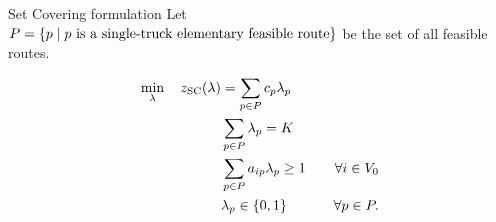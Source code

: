\begin{frame}{Set Covering formulation}
	Let $P = \Set*{p \mid p\ \text{is a single-truck elementary feasible route}}$ be the set of all feasible routes.

	\begin{align}
		\min_{\lambda} \quad z_\mt{SC}(\lambda) & = \sum_{p \in P}  c_p \lambda_p              & \label{eq:set-covering-obj-func}                                                       \\
		                                        & \sum_{p \in P} \lambda_{p} = K               & \label{eq:set-covering-K-routes}                                                       \\
		                                        & \sum_{p \in P}  a_{ip} \lambda_p \ge 1       & \quad \forall i \in V_0 \label{eq:set-covering-customers-visited-by-exactly-one-route} \\
		                                        & \lambda_p                    \in \Set*{0, 1} & \quad \forall p \in P \label{eq:set-covering-lambda-mip-var-bounds}.
	\end{align}
\end{frame}
